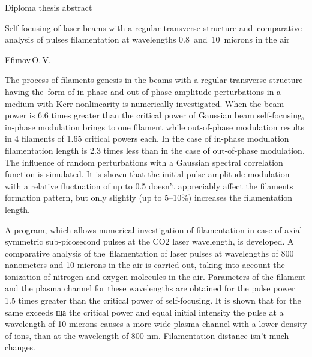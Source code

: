 \documentclass[12pt,a4paper]{article}
\begin{document}

\thispagestyle{empty}

\begin{center}
{\Large Diploma thesis abstract} \\

\vspace{2ex}

{\large Self-focusing of laser beams with a regular transverse structure and~comparative analysis of pulses filamentation at wavelengths 0.8~and~10~microns in the air} \\

\vspace{2ex}

{\large Efimov\,O.\,V.} \\
\end{center}

\vspace{2ex}

The process of filaments genesis in the beams with a regular transverse structure having the~form
of in-phase and out-of-phase amplitude perturbations in a medium with Kerr nonlinearity is numerically investigated.
When the beam power is 6.6 times greater than the critical power of Gaussian beam self-focusing,
in-phase modulation brings to one filament while out-of-phase modulation results in 4 filaments of 1.65 critical powers each.
In the case of in-phase modulation filamentation length is 2.3 times less than in the case of out-of-phase modulation.
The influence of random perturbations with a Gaussian spectral correlation function is simulated.
It is shown that the initial pulse amplitude modulation with a relative fluctuation of up to 0.5
doesn't appreciably affect the filaments formation pattern, but only slightly (up to 5--10\%) increases the filamentation length.

A program, which allows numerical investigation of filamentation in case of axial-symmetric sub-picosecond pulses
at the CO2 laser wavelength, is developed. A comparative analysis of the~filamentation of laser pulses at wavelengths
of 800 nanometers and 10 microns in the air is carried out, taking into account the ionization of nitrogen and oxygen molecules in the air.
Parameters of the filament and the plasma channel for these wavelengths are obtained for the pulse power 1.5 times greater than the critical power of self-focusing.
It is shown that for the same exceeds ща the critical power and equal initial intensity the pulse at a wavelength of 10 microns causes
a more wide plasma channel with a lower density of ions, than at the wavelength of 800 nm. Filamentation distance isn't much changes.
\end{document}
